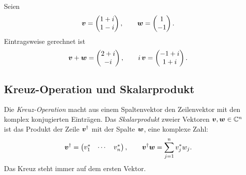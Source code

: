 \begin{beispiel}
	Seien
	\begin{equation}
		\boldsymbol{v} = \begin{pmatrix} 1+i \\ 1-i \end{pmatrix}, \qquad
		\boldsymbol{w} = \begin{pmatrix} 1 \\ -1 \end{pmatrix}.
	\end{equation}
	Eintragsweise gerechnet ist
	\begin{equation}
		\boldsymbol{v}+\boldsymbol{w} = \begin{pmatrix} 2+i \\ -i \end{pmatrix}, \qquad
		i\,\boldsymbol{v} = \begin{pmatrix} -1+i \\ 1+i \end{pmatrix}.
	\end{equation}
\end{beispiel}

\subsection{Kreuz-Operation und Skalarprodukt}
Die \emph{Kreuz-Operation} macht aus einem Spaltenvektor den Zeilenvektor mit den komplex konjugierten Einträgen. Das \emph{Skalarprodukt} zweier Vektoren $\boldsymbol{v},\boldsymbol{w}\in\mathbb{C}^n$ ist das Produkt der Zeile $\boldsymbol{v}^{\dagger}$ mit der Spalte $\boldsymbol{w}$, eine komplexe Zahl:
\begin{equation}
	\boldsymbol{v}^{\dagger} = \begin{pmatrix} v_1^* & \cdots & v_n^* \end{pmatrix}, \qquad
	\boldsymbol{v}^{\dagger}\boldsymbol{w} = \sum_{j=1}^{n} v_j^* w_j.
\end{equation}
Das Kreuz steht immer auf dem ersten Vektor.




